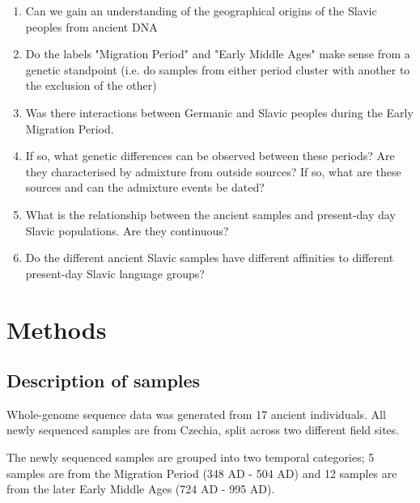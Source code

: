 \begin{enumerate}
\item Can we gain an understanding of the geographical origins of the Slavic peoples from ancient DNA
\item Do the labels "Migration Period" and "Early Middle Ages" make sense from a genetic standpoint (i.e. do samples from either period cluster with another to the exclusion of the other)
\item Was there interactions between Germanic and Slavic peoples during the Early Migration Period. 
\item If so, what genetic differences can be observed between these periods? Are they characterised by admixture from outside sources? If so, what are these sources and can the admixture events be dated?
\item What is the relationship between the ancient samples and present-day day Slavic populations. Are they continuous?
\item Do the different ancient Slavic samples have different affinities to different present-day Slavic language groups?
\end{enumerate}


\section{Methods}

\subsection{Description of samples}

Whole-genome sequence data was generated from 17 ancient individuals. All newly sequenced samples are from Czechia, split across two different field sites. 

The newly sequenced samples are grouped into two temporal categories; 5 samples are from the Migration Period (348 AD - 504 AD) and 12 samples are from the later Early Middle Ages (724 AD - 995 AD). 

